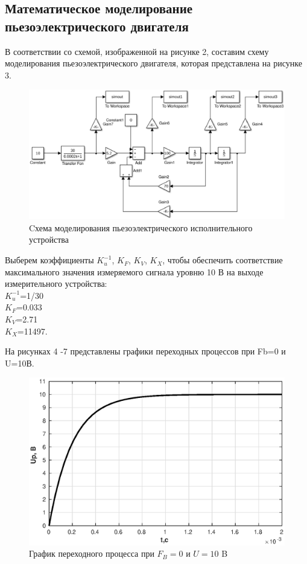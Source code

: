 \documentclass[12pt, a4paper]{article}
\begin{document}
\newpage
\begin{center}
\section{Математическое моделирование пьезоэлектрического двигателя}
\end{center} \par
В соответствии со схемой, изображенной на рисунке 2, составим схему моделирования пьезоэлектрического двигателя, которая представлена
на рисунке 3.
\begin{figure}[H]
\centering
\includegraphics[width=\textwidth]{1/cxem.eps}
\caption{Cхема моделирования пьезоэлектрического исполнительного устройства}
\end{figure}
\par Выберем коэффициенты $K_{u}^{-1}$, $K_{F}$, $K_{V}$, $K_{X}$, чтобы обеспечить соответствие максимального значения измеряемого сигнала уровню 10 В на выходе измерительного устройства:
\\ $K_{u}^{-1}$=1/30
\\ $K_{F}$=0.033
\\ $K_{V}$=2.71
\\ $K_{X}$=11497.
\par На рисунках 4 -7 представлены графики переходных процессов при Fb=0 и U=10В.

\begin{figure}[H]
\centering
\includegraphics[width = \textwidth]{1/U1.eps}
\caption{График переходного процесса при  $F_B = 0$ и $U = 10$ B }
\end{figure}
\end{document}
